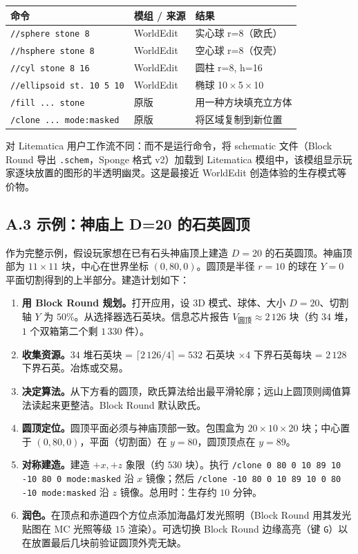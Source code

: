 \documentclass[12pt,a4paper]{scrartcl}
\newcommand{\code}[1]{\texttt{\small #1}}
\newcommand{\cmd}[1]{\textcolor{earth}{\texttt{\small #1}}}
\begin{document}
\vspace{0.4em}
\begin{center}
\small
\begin{tabularx}{\textwidth}{@{}llX@{}}
\toprule
\textbf{命令} & \textbf{模组 / 来源} & \textbf{结果} \\
\midrule
\cmd{//sphere stone 8}     & WorldEdit & 实心球 r=8（欧氏）  \\
\cmd{//hsphere stone 8}    & WorldEdit & 空心球 r=8（仅壳）  \\
\cmd{//cyl stone 8 16}     & WorldEdit & 圆柱 r=8, h=16  \\
\cmd{//ellipsoid st. 10 5 10} & WorldEdit & 椭球 10\,$\times$\,5\,$\times$\,10  \\
\cmd{/fill ... stone}      & 原版 & 用一种方块填充立方体  \\
\cmd{/clone ... mode:masked} & 原版 & 将区域复制到新位置  \\
\bottomrule
\end{tabularx}
\end{center}

对 Litematica 用户工作流不同：而不是运行命令，将 schematic 文件（Block Round 导出 \code{.schem}，Sponge 格式 v2）加载到 Litematica 模组中，该模组显示玩家逐块放置的图形的半透明幽灵。这是最接近 WorldEdit 创造体验的生存模式等价物。

\subsection*{A.3 示例：神庙上 D=20 的石英圆顶}
作为完整示例，假设玩家想在已有石头神庙顶上建造 $D=20$ 的石英圆顶。神庙顶部为 $11 \times 11$ 块，中心在世界坐标 $(0,80,0)$。圆顶是半径 $r=10$ 的球在 $Y=0$ 平面切割得到的上半部分。建造计划如下：

\begin{enumerate}[leftmargin=1.6em,itemsep=0.3em,topsep=0.3em]
  \item \textbf{用 Block Round 规划。}打开应用，设 3D 模式、球体、大小 $D=20$、切割轴 $Y$ 为 $50\%$。从选择器选石英块。信息芯片报告 $V_{\mathrm{圆顶}} \approx 2\,126$ 块（约 $34$ 堆，$1$ 个双箱第二个剩 $1\,330$ 件）。
  \item \textbf{收集资源。}$34$ 堆石英块 = $\lceil 2\,126/4 \rceil = 532$ 石英块 $\times 4$ 下界石英每块 = $2\,128$ 下界石英。冶炼或交易。
  \item \textbf{决定算法。}从下方看的圆顶，欧氏算法给出最平滑轮廓；远山上圆顶则阈值算法读起来更整洁。Block Round 默认欧氏。
  \item \textbf{圆顶定位。}圆顶平面必须与神庙顶部一致。包围盒为 $20 \times 10 \times 20$ 块；中心置于 $(0,80,0)$，平面（切割面）在 $y=80$，圆顶顶点在 $y=89$。
  \item \textbf{对称建造。}建造 $+x, +z$ 象限（约 $530$ 块）。执行 \cmd{/clone 0 80 0 10 89 10 -10 80 0 mode:masked} 沿 $x$ 镜像；然后 \cmd{/clone -10 80 0 10 89 10 0 80 -10 mode:masked} 沿 $z$ 镜像。总用时：生存约 $10$ 分钟。
  \item \textbf{润色。}在顶点和赤道四个方位点添加海晶灯发光照明（Block Round 用其发光贴图在 MC 光照等级 $15$ 渲染）。可选切换 Block Round 边缘高亮（键 \code{G}）以在放置最后几块前验证圆顶外壳无缺。
\end{enumerate}
\end{document}
